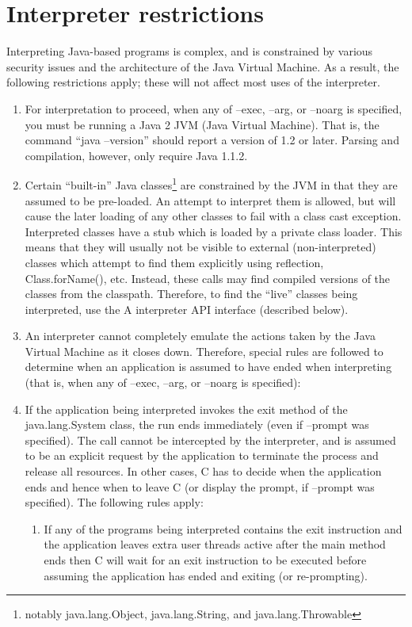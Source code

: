 \section{Interpreter restrictions} 
Interpreting Java-based programs is complex, and is constrained by various security issues and the architecture of the Java Virtual Machine. As a result, the following restrictions apply; these will not affect most uses of the interpreter. 
\begin{enumerate}
\item For interpretation to proceed, when any of –exec, –arg, or –noarg is specified, you must be running a Java 2 JVM (Java Virtual Machine). That is, the command “java –version” should report a version of 1.2 or later. Parsing and compilation, however, only require Java 1.1.2. 
\item Certain “built-in” Java classes\footnote{notably java.lang.Object, java.lang.String, and java.lang.Throwable} are constrained by the JVM in that they are assumed to be pre-loaded. An attempt to interpret them is allowed, but will cause the later loading of any other classes to fail with a class cast exception. 
Interpreted classes have a stub which is loaded by a private class loader. This means that they will usually not be visible to external (non-interpreted) classes which attempt to find them explicitly using reflection, Class.forName(), etc. Instead, these calls may find compiled versions of the classes from the classpath. Therefore, to find the “live” classes being interpreted, use the \nr{}A interpreter API interface (described below). 
\item An interpreter cannot completely emulate the actions taken by the Java Virtual Machine as it closes down. Therefore, special rules are followed to determine when an application is assumed to have ended when interpreting (that is, when any of –exec, –arg, or –noarg is specified): 
\item If the application being interpreted invokes the exit method of the java.lang.System class, the run ends immediately (even if –prompt was specified). The call cannot be intercepted by the interpreter, and is assumed to be an explicit request by the application to terminate the process and release all resources. 
In other cases, \nr{}C has to decide when the application ends and hence when to leave \nr{}C (or display the prompt, if –prompt was specified). The following rules apply:
\begin{enumerate} 
\item If any of the programs being interpreted contains the \nr{} exit instruction and the application leaves extra user threads active after the main method ends then \nr{}C will wait for an exit instruction to be executed before assuming the application has ended and exiting (or re-prompting). 

\end{enumerate}
\end{enumerate}
